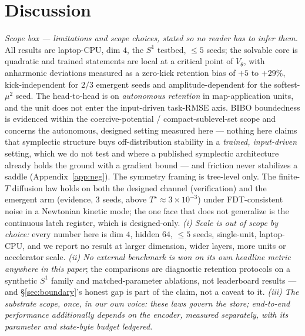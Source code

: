 \documentclass{article}
\begin{document}
\section{Discussion}\label{sec:discussion}

{\footnotesize
\emph{Scope box --- limitations and scope choices, stated so no reader has to infer them.} All results are laptop-CPU, dim $4$, the $S^1$ testbed, $\le5$ seeds; the solvable core is quadratic and trained statements are local at a critical point of $V_\theta$, with anharmonic deviations measured as a zero-kick retention bias of $+5$ to $+29\%$, kick-independent for $2/3$ emergent seeds and amplitude-dependent for the softest-$\mu^2$ seed. The head-to-head is on \emph{autonomous retention} in map-application units, and the unit does not enter the input-driven task-RMSE axis. BIBO boundedness is evidenced within the coercive-potential / compact-sublevel-set scope and concerns the autonomous, designed setting measured here --- nothing here claims that symplectic structure buys off-distribution stability in a \emph{trained, input-driven} setting, which we do not test and where a published symplectic architecture already holds the ground with a gradient bound --- and friction never stabilizes a saddle (Appendix~\ref{app:neg}). The symmetry framing is tree-level only. The finite-$T$ diffusion law holds on both the designed channel (verification) and the emergent arm (evidence, $3$ seeds, above $T^\star\approx3\!\times\!10^{-3}$) under FDT-consistent noise in a Newtonian kinetic mode; the one face that does not generalize is the continuous latch register, which is designed-only. \emph{(i) Scale is out of scope by choice:} every number here is dim $4$, hidden $64$, $\le5$ seeds, single-unit, laptop-CPU, and we report no result at larger dimension, wider layers, more units or accelerator scale. \emph{(ii) No external benchmark is won on its own headline metric anywhere in this paper}; the comparisons are diagnostic retention protocols on a synthetic $S^1$ family and matched-parameter ablations, not leaderboard results --- and \S\ref{sec:boundary}'s honest gap is part of the claim, not a caveat to it. \emph{(iii) The substrate scope, once, in our own voice: these laws govern the store; end-to-end performance additionally depends on the encoder, measured separately, with its parameter and state-byte budget ledgered.}
\par}
\end{document}
